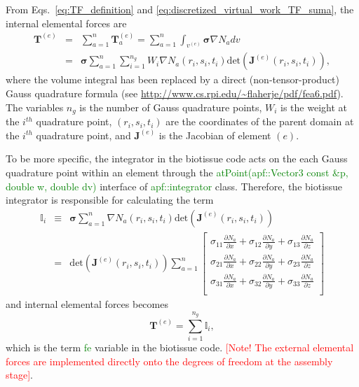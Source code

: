 \documentclass[12pt,aps,pre]{revtex4}
\newcommand{\red}[1]{\textcolor{red}{[#1]}}
\newcommand{\green}[1]{\textcolor{green}{#1}}
\begin{document}
From Eqs.\ \eqref{eq:TF_definition} and \eqref{eq:discretized_virtual_work_TF_suma}, the internal elemental forces are
%
\begin{eqnarray}
\pmb{T}^{(e)} &=& \sum_{a=1}^n \pmb{T}^{(e)}_a = \sum_{a=1}^n\int_{v^{(e)}} \pmb{\sigma}\nabla N_a dv \nonumber\\
%
&=& \pmb{\sigma} \sum_{a=1}^n  \sum_{i=1}^{n_{g}} W_{i}  \nabla N_a(r_i,s_i,t_i) \text{det}\left(\pmb{J}^{(e)}(r_i,s_i,t_i)\right),
\end{eqnarray}
%
where the volume integral has been replaced by a direct (non-tensor-product) Gauss quadrature formula (see \url{http://www.cs.rpi.edu/~flaherje/pdf/fea6.pdf}). The variables $n_{g}$ is the number of Gauss quadrature points, $W_i$ is the weight at the $i^{th}$ quadrature point, $(r_i, s_i,t_i)$ are the coordinates of the parent domain at the $i^{th}$ quadrature point, and $\pmb{J}^{(e)}$ is the Jacobian of element $(e)$.

To be more specific, the integrator in the biotissue code acts on the each Gauss quadrature point within an element through the \green{atPoint(apf::Vector3 const \&p, double w, double dv)} interface of \green{apf::integrator} class. Therefore, the biotissue integrator is responsible for calculating the term
%
\begin{eqnarray}
\pmb{\mathbb{I}}_i &\equiv& \pmb{\sigma} \sum_{a=1}^n  \nabla N_a(r_i,s_i,t_i) \text{det}\left(\pmb{J}^{(e)}(r_i,s_i,t_i)\right) \nonumber\\
&=&\text{det}\left(\pmb{J}^{(e)}(r_i,s_i,t_i)\right) \sum_{a=1}^n 
\begin{bmatrix}
\sigma_{11} \frac{\partial N_a}{\partial x} + \sigma_{12} \frac{\partial N_a}{\partial y} + \sigma_{13} \frac{\partial N_a}{\partial z} \\
%
\sigma_{21} \frac{\partial N_a}{\partial x} + \sigma_{22} \frac{\partial N_a}{\partial y} + \sigma_{23} \frac{\partial N_a}{\partial z} \\
%
\sigma_{31} \frac{\partial N_a}{\partial x} + \sigma_{32} \frac{\partial N_a}{\partial y} + \sigma_{33} \frac{\partial N_a}{\partial z} \\
\end{bmatrix} 
\end{eqnarray}
%
and internal elemental forces becomes
%
\begin{equation}
\pmb{T}^{(e)} = \sum_{i=1}^{n_g} \pmb{\mathbb{I}}_i ,
\end{equation}
%
which is the term \green{fe} variable in the biotissue code. \red{Note! The external elemental forces are implemented directly onto the degrees of freedom at the assembly stage}.



\end{document}
